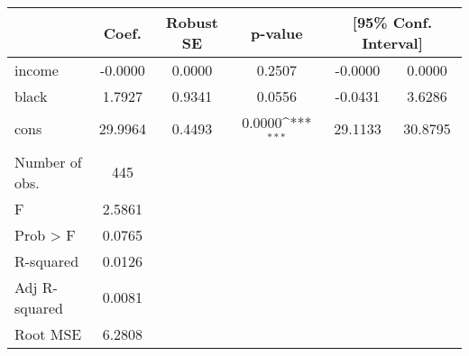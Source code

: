 {
\def\sym#1{\ifmmode^{#1}\else\(^{#1}\)\fi}
\begin{tabular}{l*{1}{ccccc}}
\toprule
            &       Coef.&   Robust SE&     p-value         &\multicolumn{2}{c}{[95\% Conf. Interval]}            \\
\midrule
income      &     -0.0000&      0.0000&      0.2507         &     -0.0000&      0.0000\\
black       &      1.7927&      0.9341&      0.0556         &     -0.0431&      3.6286\\
cons        &     29.9964&      0.4493&      0.0000\sym{***}&     29.1133&     30.8795\\
\midrule
Number of obs.&         445&            &                     &            &            \\
F           &      2.5861&            &                     &            &            \\
Prob > F    &      0.0765&            &                     &            &            \\
R-squared   &      0.0126&            &                     &            &            \\
Adj R-squared&      0.0081&            &                     &            &            \\
Root MSE    &      6.2808&            &                     &            &            \\
\bottomrule
\end{tabular}
}

